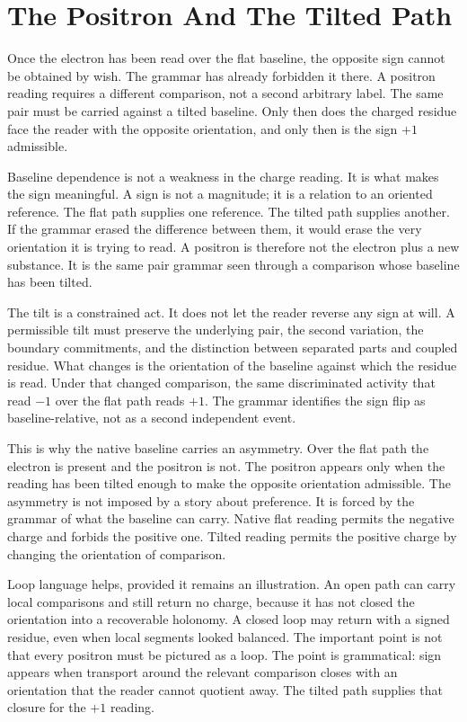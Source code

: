 \section{The Positron And The Tilted Path}

Once the electron has been read over the flat baseline, the opposite sign
cannot be obtained by wish. The grammar has already forbidden it there. A
positron reading requires a different comparison, not a second arbitrary
label. The same pair must be carried against a tilted baseline. Only then
does the charged residue face the reader with the opposite orientation, and
only then is the sign \(+1\) admissible.

Baseline dependence is not a weakness in the charge reading. It is what
makes the sign meaningful. A sign is not a magnitude; it is a relation to an
oriented reference. The flat path supplies one reference. The tilted path
supplies another. If the grammar erased the difference between them, it would
erase the very orientation it is trying to read. A positron is therefore not
the electron plus a new substance. It is the same pair grammar seen through a
comparison whose baseline has been tilted.

The tilt is a constrained act. It does not let the reader reverse any sign at
will. A permissible tilt must preserve the underlying pair, the second
variation, the boundary commitments, and the distinction between separated
parts and coupled residue. What changes is the orientation of the baseline
against which the residue is read. Under that changed comparison, the same
discriminated activity that read \(-1\) over the flat path reads \(+1\). The
grammar identifies the sign flip as baseline-relative, not as a second
independent event.

This is why the native baseline carries an asymmetry. Over the flat path the
electron is present and the positron is not. The positron appears only when
the reading has been tilted enough to make the opposite orientation
admissible. The asymmetry is not imposed by a story about preference. It is
forced by the grammar of what the baseline can carry. Native flat reading
permits the negative charge and forbids the positive one. Tilted reading
permits the positive charge by changing the orientation of comparison.

Loop language helps, provided it remains an illustration. An open path can
carry local comparisons and still return no charge, because it has not
closed the orientation into a recoverable holonomy. A closed loop may return
with a signed residue, even when local segments looked balanced. The
important point is not that every positron must be pictured as a loop. The
point is grammatical: sign appears when transport around the relevant
comparison closes with an orientation that the reader cannot quotient away.
The tilted path supplies that closure for the \(+1\) reading.

